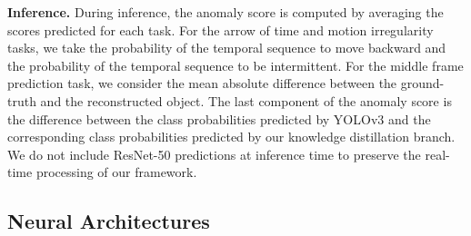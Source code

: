 \documentclass[final]{cvpr}
\begin{document}
\noindent
{\bf Inference.}
During inference, the anomaly score is computed by averaging the scores predicted for each task. For the arrow of time and motion irregularity tasks, we take the probability of the temporal sequence to move backward and the probability of the temporal sequence to be intermittent. For the middle frame prediction task, we consider the mean absolute difference between the ground-truth and the reconstructed object. The last component of the anomaly score is the difference between the class probabilities predicted by YOLOv3 and the corresponding class probabilities predicted by our knowledge distillation branch. We do not include ResNet-50 predictions at inference time to preserve the real-time processing of our framework. 

\vspace*{-0.1cm}
\subsection{Neural Architectures}  
\vspace*{-0.1cm}
\end{document}
